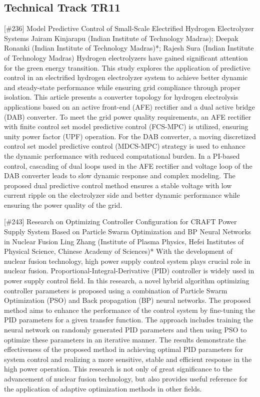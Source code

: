 \clearpage \subsection{Technical Track TR11}\nopagebreak {} \begin{abstract_online} {[\#236] Model Predictive Control of Small-Scale Electrified Hydrogen Electrolyzer Systems} {} {Jairam Kinjarapu (Indian Institute of Technology Madras); Deepak  Ronanki (Indian Institute of Technology Madras)*; Rajesh Sura (Indian Institute of Technology Madras)} {} Hydrogen electrolyzers have gained significant attention for the green energy transition. This study explores the application of predictive control in an electrified hydrogen electrolyzer system to achieve better dynamic and steady-state performance while ensuring grid compliance through proper isolation. This article presents a converter topology for hydrogen electrolysis applications based on an active front-end (AFE) rectifier and a dual active bridge (DAB) converter. To meet the grid power quality requirements, an AFE rectifier with finite control set model predictive control (FCS-MPC) is utilized, ensuring unity power factor (UPF) operation. For the DAB converter, a moving discretized control set model predictive control (MDCS-MPC) strategy is used to enhance the dynamic performance with reduced computational burden. In a PI-based control, cascading of dual loops used in the AFE rectifier and voltage loop of the DAB converter leads to slow dynamic response and complex modeling. The proposed dual predictive control method ensures a stable voltage with low current ripple on the electrolyzer side and better dynamic performance while ensuring the power quality of the grid.  \end{abstract_online} 
{} \begin{abstract_online} {[\#243] Research on Optimizing Controller Configuration for CRAFT Power Supply System Based on Particle Swarm Optimization and BP Neural Networks in Nuclear Fusion} {} {Ling Zhang (Institute of Plasma Physics, Hefei Institutes of Physical Science, Chinese Academy of Sciences)*} {} With the development of nuclear fusion technology, high power supply control system plays crucial role in nuclear fusion. Proportional-Integral-Derivative (PID) controller is widely used in power supply control field. In this research, a novel hybrid algorithm optimizing controller parameters is proposed using a combination of Particle Swarm Optimization (PSO) and Back propagation (BP) neural networks. The proposed method aims to enhance the performance of the control system by fine-tuning the PID parameters for a given transfer function. The approach includes training the neural network on randomly generated PID parameters and then using PSO to optimize these parameters in an iterative manner. The results demonstrate the effectiveness of the proposed method in achieving optimal PID parameters for system control and realizing a more sensitive, stable and efficient response in the high power operation. This research is not only of great significance to the advancement of nuclear fusion technology, but also provides useful reference for the application of adaptive optimization methods in other fields. \end{abstract_online} 
